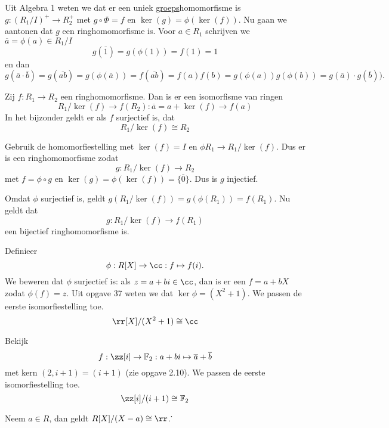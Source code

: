 \documentclass[a4paper,12pt,oneside]{book}
\begin{document}
\begin{bewijs}
Uit Algebra 1 weten we dat er een uniek \underline{groeps}homomorfisme is $g : (R_1/I)^+ \to R_2^+$ met $g \circ \Phi = f$ en $\ker(g) = \phi(\ker(f))$. Nu gaan we aantonen dat $g$ een ringhomomorfisme is.
Voor $a \in R_1$ schrijven we $\overline{a} = \phi(a) \in R_1/I$
\[
g(\overline{1}) = g(\phi(1)) = f(1) = 1
\]
en dan 
\[
g(\overline{a}\cdot\overline{b}) = g(\overline{ab}) = g(\phi(\overline{a})) = f(\overline{ab}) = f(a)f(b) = g(\phi(a))g(\phi(b)) = g(\overline{a})\cdot g(\overline{b})).
\]
\end{bewijs}

\begin{stelling}
Zij $f : R_1 \to R_2$ een ringhomomorfisme. Dan is er een isomorfisme van ringen 
\[
R_1/\ker(f) \to f(R_2) : \overline{a} = a + \ker(f) \to f(a)
\]
In het bijzonder geldt er  als $f$ surjectief is, dat 
\[
R_1/\ker(f) \cong R_2
\]
\end{stelling}

\begin{bewijs}
Gebruik de homomorfiestelling met $\ker(f) = I$ en $\phi R_1 \to R_1/\ker(f)$.
Dus er is  een ringhomomorfisme zodat
\[
g: R_1/\ker(f) \to R_2
\]
met $f = \phi \circ g$ en $\ker(g) = \phi(\ker(f)) = \{\overline{0}\}$. Dus is $g$ injectief.

Omdat $\phi$ surjectief is, geldt $g(R_1/\ker(f)) = g(\phi(R_1)) = f(R_1)$. Nu geldt dat
\[
g : R_1/\ker(f) \to f(R_1)
\]
een bijectief ringhomomorfisme is.
\end{bewijs}


\begin{voorbeeld}
Definieer 
\[
\phi : R[X] \to \cc : f \mapsto f(i).
\]
We beweren dat $\phi$ surjectief is: als $z = a+bi \in \cc$, dan is er een $f = a + bX$ zodat $\phi(f) = z$. Uit opgave 37 weten we dat $\ker \phi = (X^2 + 1)$. We passen de eerste isomorfiestelling toe. $$\rr[X]/(X^2+1) \cong \cc$$
\end{voorbeeld}
\begin{voorbeeld}
Bekijk
\[
f : \zz[i] \to \mathbb{F}_2 : a + bi \mapsto \overline{a} +  \overline{b}
\]
met kern $(2, i+1) = (i+1)$ (zie opgave 2.10). We passen de eerste isomorfiestelling toe.
 $$\zz[i]/(i+1) \cong \mathbb{F}_2 $$
\end{voorbeeld}
\begin{voorbeeld}[Evalutaieafbeelding]
Neem $a \in R$, dan geldt $R[X]/(X-a) \cong \rr$.˙
\end{voorbeeld}
\end{document}

